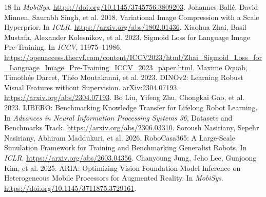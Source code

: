 \begin{thebibliography}{18}
In \emph{MobiSys}.
\url{https://doi.org/10.1145/3745756.3809203}.
Johannes Ball\'e, David Minnen, Saurabh Singh, et al. 2018.
Variational Image Compression with a Scale Hyperprior.
In \emph{ICLR}.
\url{https://arxiv.org/abs/1802.01436}.
Xiaohua Zhai, Basil Mustafa, Alexander Kolesnikov, et al. 2023.
Sigmoid Loss for Language Image Pre-Training.
In \emph{ICCV}, 11975--11986.
\url{https://openaccess.thecvf.com/content/ICCV2023/html/Zhai_Sigmoid_Loss_for_Language_Image_Pre-Training_ICCV_2023_paper.html}.
Maxime Oquab, Timoth\'ee Darcet, Th\'eo Moutakanni, et al. 2023.
DINOv2: Learning Robust Visual Features without Supervision.
arXiv:2304.07193.
\url{https://arxiv.org/abs/2304.07193}.
Bo Liu, Yifeng Zhu, Chongkai Gao, et al. 2023.
LIBERO: Benchmarking Knowledge Transfer for Lifelong Robot Learning.
In \emph{Advances in Neural Information Processing Systems 36},
Datasets and Benchmarks Track.
\url{https://arxiv.org/abs/2306.03310}.
Soroush Nasiriany, Sepehr Nasiriany, Abhiram Maddukuri, et al. 2026.
RoboCasa365: A Large-Scale Simulation Framework for Training and
Benchmarking Generalist Robots.
In \emph{ICLR}.
\url{https://arxiv.org/abs/2603.04356}.
Chanyoung Jung, Jeho Lee, Gunjoong Kim, et al. 2025.
ARIA: Optimizing Vision Foundation Model Inference on Heterogeneous
Mobile Processors for Augmented Reality.
In \emph{MobiSys}.
\url{https://doi.org/10.1145/3711875.3729161}.
\end{thebibliography}
